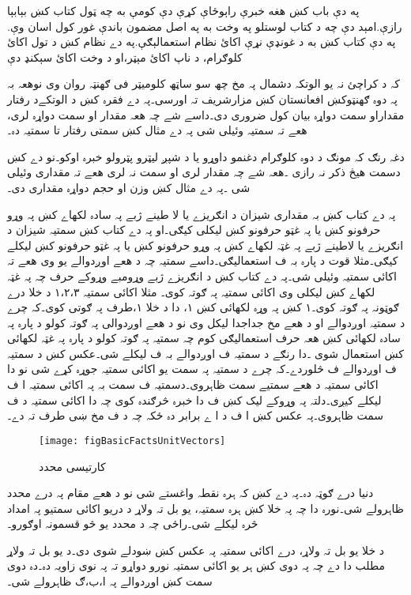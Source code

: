 په دې باب کښ هغه خبرې راېوځاې کړې دې کومې به چه ټول کتاب کښ بېابېا رازې.امېد دې چه د کتاب لوستلو په وخت به په اصل مضمون باندې غور کول اسان وې.
په دې کتاب کښ به د غونډې نړې اکائ نظام  استعمالېګې.په دے نظام کښ د تول اکائ کلوګرام، د ناپ اکائ مېټر،او د وخت اکائ سېکنډ دې 

      
کہ د کراچئ نہ یو الوتکہ دشمال پہ مخ چھ سو ساټھ کلومیټر فی ګھنټہ روان وی نوھعہ بہ پہ دوہ ګھنټوکښ افعانستان کښ مزارشریف تہ اورسی۔پہ دے فقرہ کښ د الوتکےد رفتار مقداراو سمت دواړہ بیان کول ضروری دی۔داسے شے چہ ھعہ مقدار او سمت دواړہ لری، ھعے تہ سمتیہ وئیلی شی پہ دے مثال کښ سمتی رفتار تا سمتیہ دہ۔

دغہ رنګ کہ مونګ د دوہ کلوګرام دغنمو داوړو یا د شپږ لیټرو پټرولو خبرہ اوکو۔نو دے کښ دسمت ھیڅ ذکر نہ رازی ۔ھعہ شے چہ مقدار لری او سمت نہ لری ھعے تہ مقداری وئیلی شی ۔پہ دے مثال کښ وزن او حجم دواړہ مقداری دی۔
 
پہ دے کتاب کښ بہ مقداری شیزان د انګریزے یا لا طینے ژبے پہ سادہ لکھاے کښ پہ وړو حرفونو کښ یا پہ غټو حرفونو کښ لیکلی کیګی۔او پہ دے کتاب کښ سمتیہ شیزان د انګریزے یا لاطینے ژبے پہ غټہ لکھاے کښ پہ وړو حرفونو کښ یا پہ غټو حرفونو کښ لیکلے کیګی۔مثلا قوت د پارہ بہ ف استعمالیګی۔داسے سمتیہ چہ د ھعے اوږدوالے یو وی ھعے تہ اکائی سمتیہ وئیلی شی۔پہ دے کتاب کښ د انګریزے ژبے وړومبے وړوکے حرف چہ پہ غټہ  لکھاے کښ لیکلی وی اکائی سمتیہ پہ ګوتہ کوی۔ مثلا اکائی سمتیہ  ۱،۲،۳ د خلا درے ګوټونہ پہ ګوتہ کوی۔۱ کښ پہ وړہ لکھائی کښ ۱، دا د خلا ۱،طرف پہ ګوتی کوی۔کہ چرے د سمتیہ اوږدوالے او د ھعے مخ جداجدا لیکل وی نو د ھعے اوږدوالی پہ ګوتہ کولو د پارہ پہ سادہ لکھائی کښ ھعہ حرف استعمالیګی کوم چہ سمتیہ پہ ګوتہ کولو د پارہ پہ غټہ لکھائی کښ استعمال شوی ۔دا رنګے د سمتیہ ف اوږدوالے بہ ف لیکلے شی۔عکس کښ د سمتیہ ف اوږدوالے ف څلوردے۔کہ چرے د سمتیہ پہ سمت یو اکائی سمتیہ جوړہ کړے شی نو دا اکائی سمتیہ د ھعے سمتیے سمت ظاہروی۔دسمتیہ ف سمت بہ پہ اکائی سمتیہ ا ف لیکلے کیږی۔دلتہ پہ وړوکے لیک کښ  ف دا خبرہ څرګندہ کوی چہ دا اکائی سمتیہ د ف سمت ظاہروی۔پہ عکس کښ ا ف د ا ے برابر دہ ځکہ چہ د ف مخ ښی طرف تہ دے۔     
\begin{figure}
\centering
\texttt{[image: figBasicFactsUnitVectors]}
\caption{کارتیسی محدد}
\label{شکل_حقائق_اکائی_سمتیہ}
\end{figure}
   دنیا درے ګوټہ دہ۔پہ دے کښ کہ ہرہ نقطہ واغستے شی نو د ھعے مقام پہ درے محدد ظاہرولے شی۔نورہ دا چہ پہ خلا کښ ہرہ سمتیہ،  یو بل تہ ولاړ د دریو اکائی سمتیو پہ امداد څرہ لیکلے شی۔راځی چہ د محدد یو څو قسمونہ اوګورو۔ 

د خلا یو بل تہ ولاړ، درے اکائی سمتیہ پہ عکس کښ ښودلے شوی دی۔د یو بل تہ ولاړ مطلب دا دے چہ پہ دوی کښ ہر یو اکائی سمتیہ نورو دواړو تہ پہ نوی زاویہ دہ۔دہ دوی  سمت کښ اوږدوالے پہ ا،ب،ګ ظاہرولے شی۔  

